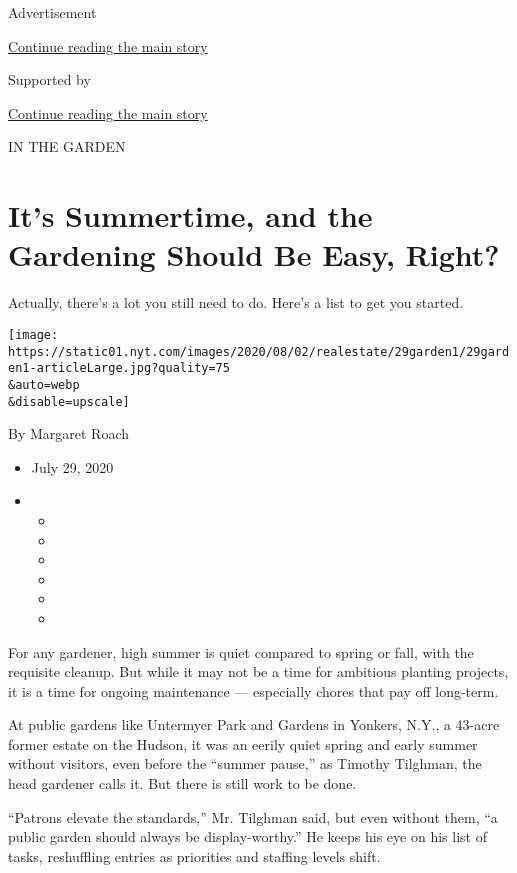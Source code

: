 Advertisement

\protect\hyperlink{after-top}{Continue reading the main story}

Supported by

\protect\hyperlink{after-sponsor}{Continue reading the main story}

IN THE GARDEN

\hypertarget{its-summertime-and-the-gardening-should-be-easy-right}{%
\section{It's Summertime, and the Gardening Should Be Easy,
Right?}\label{its-summertime-and-the-gardening-should-be-easy-right}}

Actually, there's a lot you still need to do. Here's a list to get you
started.

\texttt{[image: https://static01.nyt.com/images/2020/08/02/realestate/29garden1/29garden1-articleLarge.jpg?quality=75\\\&auto=webp\\\&disable=upscale]}

By Margaret Roach

\begin{itemize}
\item
  July 29, 2020
\item
  \begin{itemize}
  \item
  \item
  \item
  \item
  \item
  \item
  \end{itemize}
\end{itemize}

For any gardener, high summer is quiet compared to spring or fall, with
the requisite cleanup. But while it may not be a time for ambitious
planting projects, it is a time for ongoing maintenance --- especially
chores that pay off long-term.

At public gardens like Untermyer Park and Gardens in Yonkers, N.Y., a
43-acre former estate on the Hudson, it was an eerily quiet spring and
early summer without visitors, even before the ``summer pause,'' as
Timothy Tilghman, the head gardener calls it. But there is still work to
be done.

``Patrons elevate the standards,'' Mr. Tilghman said, but even without
them, ``a public garden should always be display-worthy.'' He keeps his
eye on his list of tasks, reshuffling entries as priorities and staffing
levels shift.


